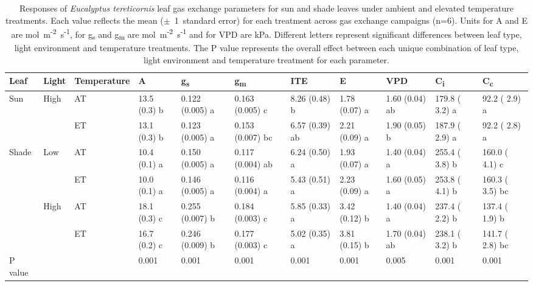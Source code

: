\documentclass[a4paper]{article}\usepackage[]{graphicx}\usepackage[]{color}
\begin{document}
\begin{table}
\centering
\caption{Responses of \textit{Eucalyptus tereticornis} leaf gas exchange parameters for sun and shade leaves under ambient and elevated temperature treatments. Each value reflects the mean ($\pm$~1~standard error) for each treatment across gas exchange campaigns (n=6). Units for A and E are {\textmugreek}mol~m\textsuperscript{-2}~s\textsuperscript{-1}, for g\textsubscript{s} and g\textsubscript{m} are mol~m\textsuperscript{-2}~s\textsuperscript{-1} and for VPD are kPa. Different letters represent significant differences between leaf type, light environment and temperature treatments. The P value represents the overall effect between each unique combination of leaf type, light environment and temperature treatment for each parameter.} 
\label{table:Table 3.2}
\begin{tabular}{lllllllllll}
  \hline
Leaf & Light & Temperature & A & g\textsubscript{s} & g\textsubscript{m} & ITE & E & VPD & C\textsubscript{i} & C\textsubscript{c} \\ 
  \hline
Sun & High & AT & 13.5 (0.3) b & 0.122 (0.005) a & 0.163 (0.005) c & 8.26 (0.48) b & 1.78 (0.07) a & 1.60 (0.04) ab & 179.8 ( 3.2) a & 92.2 ( 2.9) a \\ 
   &  & ET & 13.1 (0.3) b & 0.123 (0.005) a & 0.153 (0.007) bc & 6.57 (0.39) ab & 2.21 (0.09) a & 1.90 (0.05) b & 187.9 ( 2.9) a & 92.2 ( 2.8) a \\ 
  Shade & Low & AT & 10.4 (0.1) a & 0.150 (0.005) a & 0.117 (0.004) ab & 6.24 (0.50) a & 1.93 (0.07) a & 1.40 (0.04) a & 255.4 ( 3.8) b & 160.0 ( 4.1) c \\ 
   &  & ET & 10.0 (0.1) a & 0.146 (0.005) a & 0.116 (0.004) a & 5.43 (0.51) a & 2.23 (0.09) a & 1.60 (0.05) a & 253.8 ( 4.1) b & 160.3 ( 3.5) bc \\ 
   & High & AT & 18.1 (0.3) c & 0.255 (0.007) b & 0.184 (0.003) c & 5.85 (0.33) a & 3.42 (0.12) b & 1.40 (0.04) a & 237.4 ( 2.2) b & 137.4 ( 1.9) b \\ 
   &  & ET & 16.7 (0.2) c & 0.246 (0.009) b & 0.177 (0.003) c & 5.02 (0.35) a & 3.81 (0.15) b & 1.70 (0.04) ab & 238.1 ( 3.2) b & 141.7 ( 2.8) bc \\ 
   \hline
P value &  &  & 0.001 & 0.001 & 0.001 & 0.001 & 0.001 & 0.005 & 0.001 & 0.001 \\ 
   \hline
\end{tabular}
\end{table}
\end{document}
